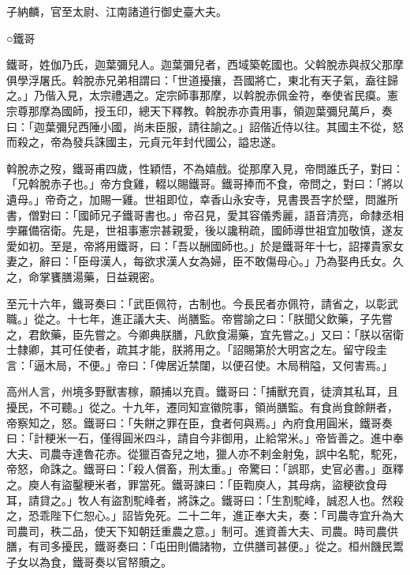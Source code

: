 \begin{pinyinscope}
 子納麟，官至太尉、江南諸道行御史臺大夫。



 ○鐵哥



 鐵哥，姓伽乃氏，迦葉彌兒人。迦葉彌兒者，西域築乾國也。父斡脫赤與叔父那摩俱學浮屠氏。斡脫赤兄弟相謂曰：「世道擾攘，吾國將亡，東北有天子氣，盍往歸之。」乃偕入見，太宗禮遇之。定宗師事那摩，以斡脫赤佩金符，奉使省民瘼。憲宗尊那摩為國師，授玉印，總天下釋教。斡脫赤亦貴用事，領迦葉彌兒萬戶，奏曰：「迦葉彌兒西陲小國，尚未臣服，請往諭之。」詔偕近侍以往。其國主不從，怒而殺之，帝為發兵誅國主，元貞元年封代國公，謚忠遂。



 斡脫赤之歿，鐵哥甫四歲，性穎悟，不為嬉戲。從那摩入見，帝問誰氏子，對曰：「兄斡脫赤子也。」帝方食雞，輟以賜鐵哥。鐵哥捧而不食，帝問之，對曰：「將以遺母。」帝奇之，加賜一雞。世祖即位，幸香山永安寺，見書畏吾字於壁，問誰所書，僧對曰：「國師兄子鐵哥書也。」帝召見，愛其容儀秀麗，語音清亮，命隸丞相孛羅備宿衛。先是，世祖事憲宗甚親愛，後以讒稍疏，國師導世祖宜加敬慎，遂友愛如初。至是，帝將用鐵哥，曰：「吾以酬國師也。」於是鐵哥年十七，詔擇貴家女妻之，辭曰：「臣母漢人，每欲求漢人女為婦，臣不敢傷母心。」乃為娶冉氏女。久之，命掌饔膳湯藥，日益親密。



 至元十六年，鐵哥奏曰：「武臣佩符，古制也。今長民者亦佩符，請省之，以彰武職。」從之。十七年，進正議大夫、尚膳監。帝嘗諭之曰：「朕聞父飲藥，子先嘗之，君飲藥，臣先嘗之。今卿典朕膳，凡飲食湯藥，宜先嘗之。」又曰：「朕以宿衛士隸卿，其可任使者，疏其才能，朕將用之。「詔賜第於大明宮之左。留守段圭言：「逼木局，不便。」帝曰：「俾居近禁闥，以便召使。木局稍隘，又何害焉。」



 高州人言，州境多野獸害稼，願捕以充貢。鐵哥曰：「捕獸充貢，徒濟其私耳，且擾民，不可聽。」從之。十九年，遷同知宣徽院事，領尚膳監。有食尚食餘餅者，帝察知之，怒。鐵哥曰：「失餅之罪在臣，食者何與焉。」內府食用圓米，鐵哥奏曰：「計粳米一石，僅得圓米四斗，請自今非御用，止給常米。」帝皆善之。進中奉大夫、司農寺達魯花赤。從獵百杳兒之地，獵人亦不剌金射兔，誤中名駝，駝死，帝怒，命誅之。鐵哥曰：「殺人償畜，刑太重。」帝驚曰：「誤耶，史官必書。」亟釋之。庾人有盜鑿粳米者，罪當死。鐵哥諫曰：「臣鞫庾人，其母病，盜粳欲食母耳，請貸之。」牧人有盜割駝峰者，將誅之。鐵哥曰：「生割駝峰，誠忍人也。然殺之，恐乖陛下仁恕心。」詔皆免死。二十二年，進正奉大夫，奏：「司農寺宜升為大司農司，秩二品，使天下知朝廷重農之意。」制可。進資善大夫、司農。時司農供膳，有司多擾民，鐵哥奏曰：「屯田則備諸物，立供膳司甚便。」從之。桓州饑民鬻子女以為食，鐵哥奏以官帑贖之。




\end{pinyinscope}
